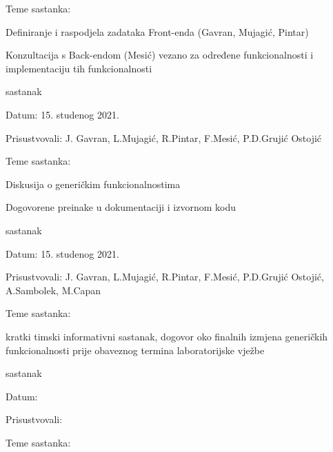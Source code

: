 \begin{packed_enum}
\begin{packed_item}
    			\item Teme sastanka:
    			\begin{packed_item}
    				\item Definiranje i raspodjela zadataka Front-enda (Gavran, Mujagić, Pintar)
    				\item Konzultacija s Back-endom (Mesić) vezano za određene funkcionalnosti i implementaciju tih funkcionalnosti 
    			\end{packed_item}
    		\end{packed_item}	
    		\item  sastanak
    		\item[] \begin{packed_item}
    			\item Datum: 15. studenog 2021.
    			\item Prisustvovali: J. Gavran, L.Mujagić, R.Pintar, F.Mesić, P.D.Grujić Ostojić
    			\item Teme sastanka:
    			\begin{packed_item}
    				\item Diskusija o generičkim funkcionalnostima 
    				\item Dogovorene preinake u dokumentaciji i izvornom kodu
    			\end{packed_item}
    		\end{packed_item}	
    	
	    	\item  sastanak
	    	\item[] \begin{packed_item}
	    		\item Datum: 15. studenog 2021.
	    		\item Prisustvovali: J. Gavran, L.Mujagić, R.Pintar, F.Mesić, P.D.Grujić Ostojić, A.Sambolek, M.Capan
	    		\item Teme sastanka:
	    		\begin{packed_item}
	    			\item kratki timski informativni sastanak, dogovor oko finalnih izmjena generičkih funkcionalnosti prije obaveznog termina laboratorijske vježbe
	    		\end{packed_item}
	    	\end{packed_item}	
		\item sastanak
		\item[] \begin{packed_item}
    			\item Datum: 
    			\item Prisustvovali:
    			\item Teme sastanka:
    			\begin{packed_item}
    				\item
    				\item
    			\end{packed_item}
    		\end{packed_item}

		\end{packed_enum}	
		
